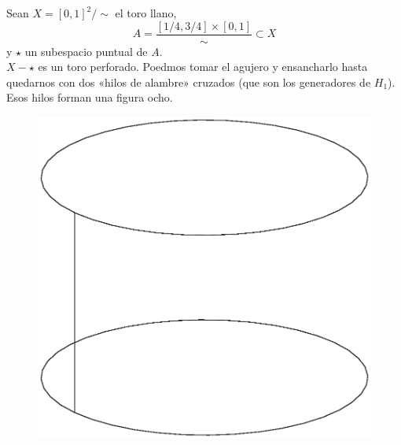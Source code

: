 \begin{ejem}
Sean $X=[0,1]^2/\sim$ el toro llano, $$A=\frac{[1/4,3/4]\times[0,1]}{\sim} \subset X$$ y $\star$ un subespacio puntual de $A$.
\\

$X-\star$ es un toro perforado. Poedmos tomar el agujero y ensancharlo hasta quedarnos con dos «hilos de alambre» cruzados (que son los generadores de $H_1$). Esos hilos forman una figura ocho.
\\

\begin{figure}[h]
\centering
\includegraphics[scale=0.4]{Figures/1EsqCilindro.eps}

\end{figure}
\end{ejem}
